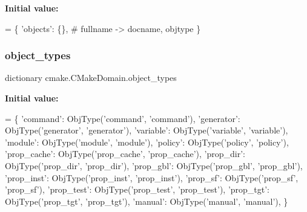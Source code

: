 {\bfseries Initial value\+:}
\begin{DoxyCode}
=  \{
        \textcolor{stringliteral}{'objects'}: \{\},  \textcolor{comment}{# fullname -> docname, objtype}
    \}
\end{DoxyCode}
\mbox{\label{classcmake_1_1CMakeDomain_aed7e1d6464c1ee93cb9ec7deb5a44f52}} 
\subsubsection{\texorpdfstring{object\+\_\+types}{object\_types}}
{\footnotesize\ttfamily dictionary cmake.\+C\+Make\+Domain.\+object\+\_\+types\hspace{0.3cm}{\ttfamily [static]}}

{\bfseries Initial value\+:}
\begin{DoxyCode}
=  \{
        \textcolor{stringliteral}{'command'}:    ObjType(\textcolor{stringliteral}{'command'},    \textcolor{stringliteral}{'command'}),
        \textcolor{stringliteral}{'generator'}:  ObjType(\textcolor{stringliteral}{'generator'},  \textcolor{stringliteral}{'generator'}),
        \textcolor{stringliteral}{'variable'}:   ObjType(\textcolor{stringliteral}{'variable'},   \textcolor{stringliteral}{'variable'}),
        \textcolor{stringliteral}{'module'}:     ObjType(\textcolor{stringliteral}{'module'},     \textcolor{stringliteral}{'module'}),
        \textcolor{stringliteral}{'policy'}:     ObjType(\textcolor{stringliteral}{'policy'},     \textcolor{stringliteral}{'policy'}),
        \textcolor{stringliteral}{'prop\_cache'}: ObjType(\textcolor{stringliteral}{'prop\_cache'}, \textcolor{stringliteral}{'prop\_cache'}),
        \textcolor{stringliteral}{'prop\_dir'}:   ObjType(\textcolor{stringliteral}{'prop\_dir'},   \textcolor{stringliteral}{'prop\_dir'}),
        \textcolor{stringliteral}{'prop\_gbl'}:   ObjType(\textcolor{stringliteral}{'prop\_gbl'},   \textcolor{stringliteral}{'prop\_gbl'}),
        \textcolor{stringliteral}{'prop\_inst'}:  ObjType(\textcolor{stringliteral}{'prop\_inst'},  \textcolor{stringliteral}{'prop\_inst'}),
        \textcolor{stringliteral}{'prop\_sf'}:    ObjType(\textcolor{stringliteral}{'prop\_sf'},    \textcolor{stringliteral}{'prop\_sf'}),
        \textcolor{stringliteral}{'prop\_test'}:  ObjType(\textcolor{stringliteral}{'prop\_test'},  \textcolor{stringliteral}{'prop\_test'}),
        \textcolor{stringliteral}{'prop\_tgt'}:   ObjType(\textcolor{stringliteral}{'prop\_tgt'},   \textcolor{stringliteral}{'prop\_tgt'}),
        \textcolor{stringliteral}{'manual'}:     ObjType(\textcolor{stringliteral}{'manual'},     \textcolor{stringliteral}{'manual'}),
    \}
\end{DoxyCode}
\mbox{\label{classcmake_1_1CMakeDomain_a1a3a56c898d9720d688dea47de1715aa}} 
